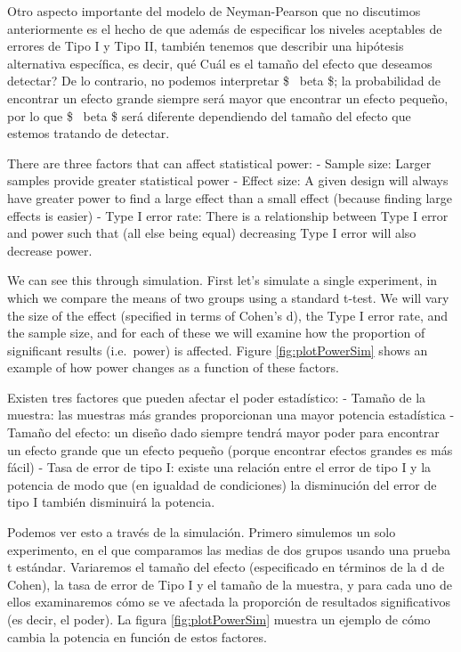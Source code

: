 \documentclass[
  12pt,
]{book}
\theoremstyle{definition}
\theoremstyle{definition}
\theoremstyle{definition}
\theoremstyle{remark}
\begin{document}
Otro aspecto importante del modelo de Neyman-Pearson que no discutimos anteriormente es el hecho de que además de especificar los niveles aceptables de errores de Tipo I y Tipo II, también tenemos que describir una hipótesis alternativa específica, es decir, qué Cuál es el tamaño del efecto que deseamos detectar? De lo contrario, no podemos interpretar \$ ~beta \$; la probabilidad de encontrar un efecto grande siempre será mayor que encontrar un efecto pequeño, por lo que \$ ~beta \$ será diferente dependiendo del tamaño del efecto que estemos tratando de detectar.

There are three factors that can affect statistical power:
- Sample size: Larger samples provide greater statistical power
- Effect size: A given design will always have greater power to find a large effect than a small effect (because finding large effects is easier)
- Type I error rate: There is a relationship between Type I error and power such that (all else being equal) decreasing Type I error will also decrease power.

We can see this through simulation. First let's simulate a single experiment, in which we compare the means of two groups using a standard t-test. We will vary the size of the effect (specified in terms of Cohen's d), the Type I error rate, and the sample size, and for each of these we will examine how the proportion of significant results (i.e.~power) is affected. Figure \ref{fig:plotPowerSim} shows an example of how power changes as a function of these factors.

Existen tres factores que pueden afectar el poder estadístico:
- Tamaño de la muestra: las muestras más grandes proporcionan una mayor potencia estadística
- Tamaño del efecto: un diseño dado siempre tendrá mayor poder para encontrar un efecto grande que un efecto pequeño (porque encontrar efectos grandes es más fácil)
- Tasa de error de tipo I: existe una relación entre el error de tipo I y la potencia de modo que (en igualdad de condiciones) la disminución del error de tipo I también disminuirá la potencia.

Podemos ver esto a través de la simulación. Primero simulemos un solo experimento, en el que comparamos las medias de dos grupos usando una prueba t estándar. Variaremos el tamaño del efecto (especificado en términos de la d de Cohen), la tasa de error de Tipo I y el tamaño de la muestra, y para cada uno de ellos examinaremos cómo se ve afectada la proporción de resultados significativos (es decir, el poder). La figura \ref{fig:plotPowerSim} muestra un ejemplo de cómo cambia la potencia en función de estos factores.
\end{document}
